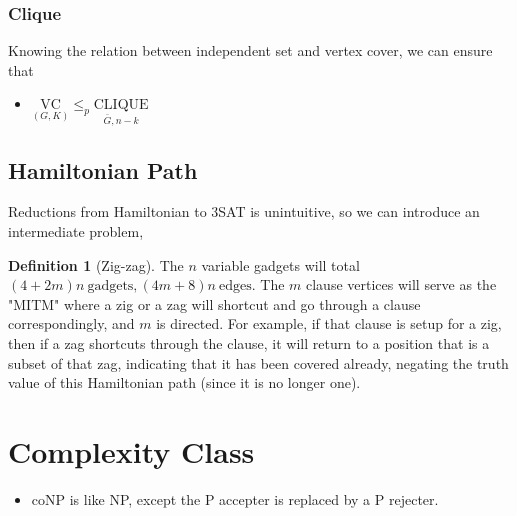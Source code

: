 \documentclass{article}
\newcommand{\uset}[2]{\underset{#1}{#2}}
\theoremstyle{definition}
\newtheorem{definition}{Definition}[section]
\theoremstyle{remark}
\begin{document}
\subsubsection*{Clique}
Knowing the relation between independent set and vertex cover, we can ensure that
\begin{itemize}
    \item $\uset{(G, K)}{\text{VC}} \leq_p \uset{\bar{G}, n - k}{\text{CLIQUE}}$
\end{itemize}

\subsection{Hamiltonian Path}
Reductions from Hamiltonian to 3SAT is unintuitive, so we can introduce an intermediate problem,
\begin{definition}[Zig-zag]
    The $n$ variable gadgets will total $(4 + 2m)n \ \text{gadgets}, (4m + 8)n \ \text{edges}$. The $m$ clause vertices will serve as the "MITM" where a zig or a zag will shortcut and go through a clause correspondingly, and $m$ is directed. For example, if that clause is setup for a zig, then if a zag shortcuts through the clause, it will return to a position that is a subset of that zag, indicating that it has been covered already, negating the truth value of this Hamiltonian path (since it is no longer one).
\end{definition}

\section{Complexity Class}

\begin{itemize}
    \item coNP is like NP, except the P accepter is replaced by a P rejecter.
\end{itemize}
\end{document}
